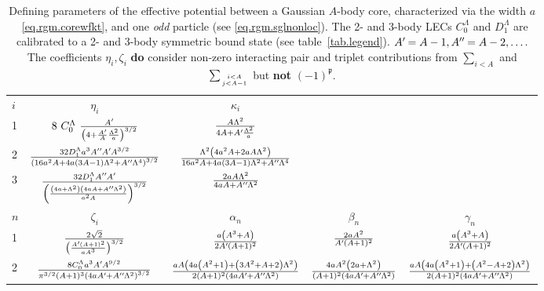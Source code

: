 \documentclass
[aps,nofootinbib,prl,showpacs,twocolumn,groupedaddress,superscriptaddress]
{revtex4}
\newcommand*{\mprime}{^{\prime}\mkern-1.2mu}
\newcommand*{\mdprime}{^{\prime\prime}\mkern-1.2mu}
\begin{document}
\begin{widetext}
\begin{turnpage}
\begin{table}
\setlength{\tabcolsep}{4pt}
\renewcommand{\arraystretch}{2.4}
\caption{\label{tab.rgmpot}{Defining parameters of the effective potential between
a Gaussian $A$-body core, characterized via the width $a$~\eqref{eq.rgm.corewfkt},
and one {\it odd} particle (see \eqref{eq.rgm.sglnonloc}).
The 2- and 3-body LECs $C^\Lambda_0$ and $D^\Lambda_1$ are
calibrated to a 2- and 3-body symmetric bound state (see table~\ref{tab.legend}).
$A\mprime=A-1, A\mdprime=A-2, \ldots$. The coefficients $\eta_i,\zeta_i$ {\bf do}
consider non-zero interacting pair and triplet contributions from $\sum_{i<A}$ and
$\sum_{i<A\atop j<A-1}$ but {\bf not} $(-1)^{\mathfrak{p}}$.}}
\small\centering
\begin{tabular}{lc|ccc}
\hline\hline
$i$ & $\eta_i$ & $\kappa_i$ & & \\
1   & $8~C_0^\Lambda~\frac{A\mprime}{\left(4+\frac{A\mprime}{A}\frac{\Lambda^2}{a}\right)^{3/2}}$  & $\frac{A\Lambda^2}{4A+A\mprime\frac{\Lambda^2}{a}}$ \\
2   & $
\frac{32 D_1^\Lambda a^3 A\mdprime A\mprime A^{3/2}}
{\left(16 a^2 A+4 a (3 A-1) \Lambda ^2+A\mdprime \Lambda ^4\right)^{3/2}}$ &
$\frac{\Lambda ^2 \left(4 a^2 A+2 a A \Lambda ^2\right)}
{16 a^2 A+4 a (3 A-1) \Lambda ^2+A\mdprime \Lambda ^4}$ \\
3 & 
$\frac{32 D_1^\Lambda A\mdprime A\mprime}{\left(\frac{\left(4 a+\Lambda ^2\right) \left(4 a A+A\mdprime \Lambda ^2\right)}{a^2 A}\right)^{3/2}}$ & $\frac{2 a A \Lambda ^2}{4 a A+A\mdprime \Lambda ^2}$ \\
\hline
$n$ & $\zeta_i$ & $\alpha_n$ & $\beta_n$ & $\gamma_n$ \\
1 &$\frac{2 \sqrt{2}}{\left(\frac{A\mprime (A+1)^2}{a A^3}\right)^{3/2}}$&
$\frac{a \left(A^3+A\right)}{2 A\mprime (A+1)^2}$&
$\frac{2 a A^2}{A\mprime (A+1)^2}$&
$\frac{a \left(A^3+A\right)}{2 A\mprime (A+1)^2}$\\
2 & 
$ \frac{8 C_0^\Lambda a^3 A\mprime A^{9/2}}{\pi ^{3/2} (A+1)^3 \left(4 a A\mprime+A\mdprime \Lambda ^2\right)^{3/2}}  $ & 
$\frac{\text{} a A \left(4 a \left(A^2+1\right)+\left(3 A^2+A+2\right) \Lambda ^2\right)}{2 (A+1)^2 \left(4 a A\mprime+A\mdprime \Lambda ^2\right)}$&
$\frac{4 \text{} a A^2 \left(2 a+\Lambda ^2\right)}{(A+1)^2 \left(4 a A\mprime+A\mdprime \Lambda ^2\right)}$&
$\frac{a A \left(4 a \left(A^2+1\right)+\left(A^2-A+2\right) \Lambda ^2\right)}{2 (A+1)^2 \left(4 a A\mprime+A\mdprime \Lambda ^2\right)}$ \\

\end{tabular}
\end{table}
\end{turnpage}
\end{widetext}
\end{document}
